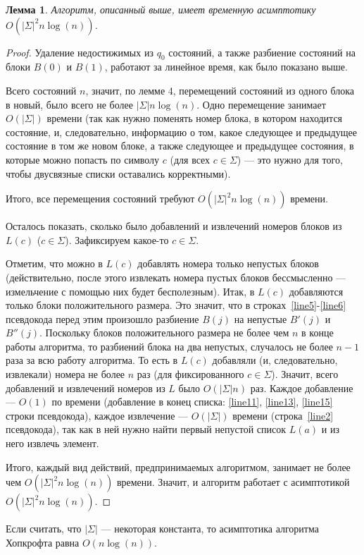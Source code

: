 \documentclass{article}
\newtheorem{lemma}{Лемма}
\begin{document}
\begin{lemma}
  Алгоритм, описанный выше, имеет временную асимптотику $O(|\Sigma|^2n\log(n))$.
\end{lemma}
\begin{proof}
  Удаление недостижимых из $q_0$ состояний, а также разбиение состояний на блоки $B(0)$ и $B(1)$, работают за линейное время, как было показано выше.

  Всего состояний $n$, значит, по лемме 4, перемещений состояний из одного блока в новый, было всего не более $|\Sigma| n \log(n)$. Одно перемещение занимает $O(|\Sigma|)$ времени (так как нужно поменять номер блока, в котором находится состояние, и, следовательно, информацию о том, какое следующее и предыдущее состояние в том же новом блоке, а также следующее и предыдущее состояния, в которые можно попасть по символу $c$ (для всех $c \in \Sigma$) --- это нужно для того, чтобы двусвязные списки оставались корректными).

  Итого, все перемещения состояний требуют $O(|\Sigma|^2n\log(n))$ времени.

  Осталось показать, сколько было добавлений и извлечений номеров блоков из $L(c)$ ($c \in \Sigma$). Зафиксируем какое-то $c \in \Sigma$.

  Отметим, что можно в $L(c)$ добавлять номера только непустых блоков (действительно, после этого извлекать номера пустых блоков бессмысленно --- измельчение с помощью них будет бесполезным). Итак, в $L(c)$ добавляются только блоки положительного размера. Это значит, что в строках~\ref{line5}-\ref{line6} псевдокода перед этим произошло разбиение $B(j)$ на непустые $B'(j)$ и $B''(j)$. Поскольку блоков положительного размера не более чем $n$ в конце работы алгоритма, то разбиений блока на два непустых, случалось не более $n - 1$ раза за всю работу алгоритма. То есть в $L(c)$ добавляли (и, следовательно, извлекали) номера не более $n$ раз (для фиксированного $c \in \Sigma$). Значит, всего добавлений и извлечений номеров из $L$ было $O(|\Sigma| n)$ раз. Каждое добавление --- $O(1)$ по времени (добавление в конец списка: \ref{line11}, \ref{line13}, \ref{line15} строки псевдокода), каждое извлечение --- $O(|\Sigma|)$ времени (строка~\ref{line2} псевдокода), так как в ней нужно найти первый непустой список $L(a)$ и из него извлечь элемент.

  Итого, каждый вид действий, предпринимаемых алгоритмом, занимает не более чем $O(|\Sigma|^2n\log(n))$ времени. Значит, и алгоритм работает с асимптотикой $O(|\Sigma|^2n\log(n))$.

\end{proof}
Если считать, что $|\Sigma|$ --- некоторая константа, то асимптотика алгоритма Хопкрофта равна $O(n\log(n))$.
\end{document}
